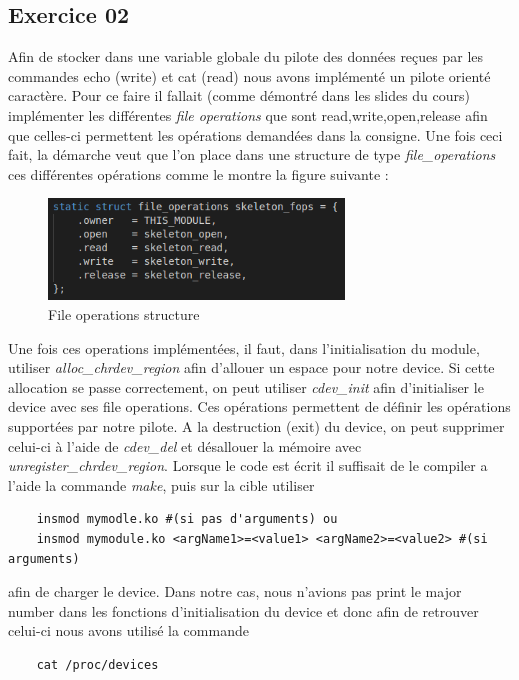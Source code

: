 \documentclass{ReportTemplate}
\begin{document}
\subsection{Exercice 02}
Afin de stocker dans une variable globale du pilote des données reçues par les
commandes echo (write) et cat (read) nous avons implémenté un pilote orienté
caractère. Pour ce faire il fallait (comme démontré dans les slides du cours)
implémenter les différentes \textit{file operations} que sont
read,write,open,release afin que celles-ci permettent les opérations demandées
dans la consigne. Une fois ceci fait, la démarche veut que l'on place dans une
structure de type \textit{file\_operations} ces différentes opérations comme le
montre la figure suivante :
\begin{figure}[H]
    \centering
    \includegraphics[width=0.7\textwidth]{imageSources/Fops.png}
    \caption{File operations structure}
    \label{fig:Fops}
\end{figure}
Une fois ces operations implémentées, il faut, dans l'initialisation du module,
utiliser \textit{alloc\_chrdev\_region} afin d'allouer un espace pour notre
device. Si cette allocation se passe correctement, on peut utiliser
\textit{cdev\_init} afin d'initialiser le device avec ses file operations. Ces
opérations permettent de définir les opérations supportées par notre
pilote.\newline
A la destruction (exit) du device, on peut supprimer celui-ci à l'aide de
\textit{cdev\_del} et désallouer la mémoire avec
\textit{unregister\_chrdev\_region}. \newline
Lorsque le code est écrit il suffisait de le compiler a l'aide la commande \textit{make},
puis sur la cible utiliser
\begin{verbatim} 
    insmod mymodle.ko #(si pas d'arguments) ou 
    insmod mymodule.ko <argName1>=<value1> <argName2>=<value2> #(si arguments)
\end{verbatim}    
afin de charger le device. Dans notre cas, nous n'avions pas print le major number dans
les fonctions d'initialisation du device et donc afin de retrouver celui-ci nous
avons utilisé la commande 
\begin{verbatim}
    cat /proc/devices 
\end{verbatim}
\end{document}
